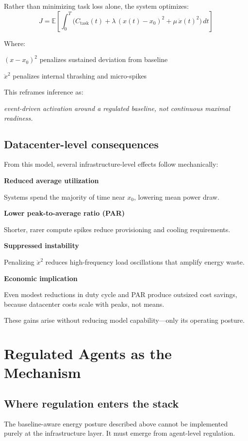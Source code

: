 \documentclass[11pt]{article}
\begin{document}
Rather than minimizing task loss alone, the system optimizes:
\[
J=\mathbb{E}\!\left[
\int_{0}^{T}
\Big(
C_{\mathrm{task}}(t) + \lambda\,(x(t)-x_{0})^{2} + \mu\,\ddot{x}(t)^{2}
\Big)\,dt
\right]
\]

Where:

\((x-x_0)^2\) penalizes sustained deviation from baseline

\(\ddot{x}^{2}\) penalizes internal thrashing and micro-spikes

This reframes inference as: 

\hspace*{1.5em}\textit{event-driven activation around a regulated baseline, not continuous maximal readiness.}

\subsection{Datacenter-level consequences}
From this model, several infrastructure-level effects follow mechanically:

\textbf{Reduced average utilization}

Systems spend the majority of time near \(x_0\), lowering mean power draw.

\textbf{Lower peak-to-average ratio (PAR)}

Shorter, rarer compute spikes reduce provisioning and cooling requirements.

\textbf{Suppressed instability}

Penalizing \(\ddot{x}^{2}\) reduces high-frequency load oscillations that amplify energy waste.

\textbf{Economic implication}

Even modest reductions in duty cycle and PAR produce outsized cost savings, because datacenter costs scale with peaks, not means.

\hspace*{1.5em} These gains arise without reducing model capability—only its operating posture.

\section{Regulated Agents as the Mechanism}

\subsection{Where regulation enters the stack}
The baseline-aware energy posture described above cannot be implemented purely at the infrastructure layer. It must emerge from agent-level regulation.
\end{document}
